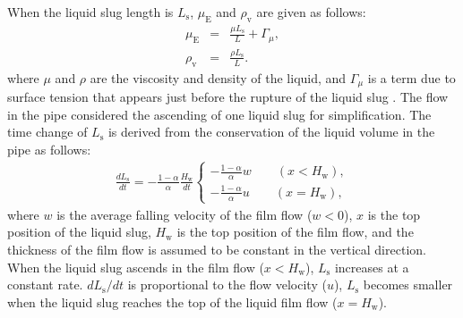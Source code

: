 \documentclass[aps,pre,preprint,groupedaddress,showkeys]{revtex4-2}
\begin{document}
When the liquid slug length is $L_ \mathrm{s}$, $\mu_\mathrm{E}$ and $\rho_\mathrm{v}$ are given as follows:
\begin{eqnarray}
\mu_\mathrm{E} &=& \frac{\mu L_\mathrm{s}}{L} + \Gamma_\mu \label{mue},\\
\rho_\mathrm{v} &=& \frac{\rho L_\mathrm{s}}{L}. \label{rhov}
\end{eqnarray}
where $\mu$ and $\rho$ are the viscosity and density of the liquid, and $\Gamma_ \mu$ is a term due to surface tension that appears just before the rupture of the liquid slug \citep{kanno2018}.
The flow in the pipe considered the ascending of one liquid slug for simplification.
The time change of $L_\mathrm{s}$ is derived from the conservation of the liquid volume in the pipe as follows:
\begin{eqnarray}
\frac{dL_\mathrm{s}}{dt}= - \frac{1-\alpha}{\alpha} \frac{H_\mathrm{w}}{dt} \left\{
  \begin{array}{ll}
  -\frac{1-\alpha}{\alpha} w \qquad (x<H_\mathrm{w}), \\
   -\frac{1-\alpha}{\alpha} u \qquad (x=H_\mathrm{w}),
  \end{array}
  \right. 
  \label{dLdt}
\end{eqnarray}
where $ w $ is the average falling velocity of the film flow ($ w <0 $), $ x $ is the top position of the liquid slug, $ H_ \mathrm {w} $ is the top position of the film flow, and the thickness of the film flow is assumed to be constant in the vertical direction.
When the liquid slug ascends in the film flow ($ x <H_ \mathrm{w} $), $ L_ \mathrm{s} $ increases at a constant rate.
$ dL_ \mathrm{s} / dt $ is proportional to the flow velocity ($ u $), $ L_ \mathrm{s} $ becomes smaller when the liquid slug reaches the top of the liquid film flow ($ x = H_ \mathrm{w}$).
\end{document}
